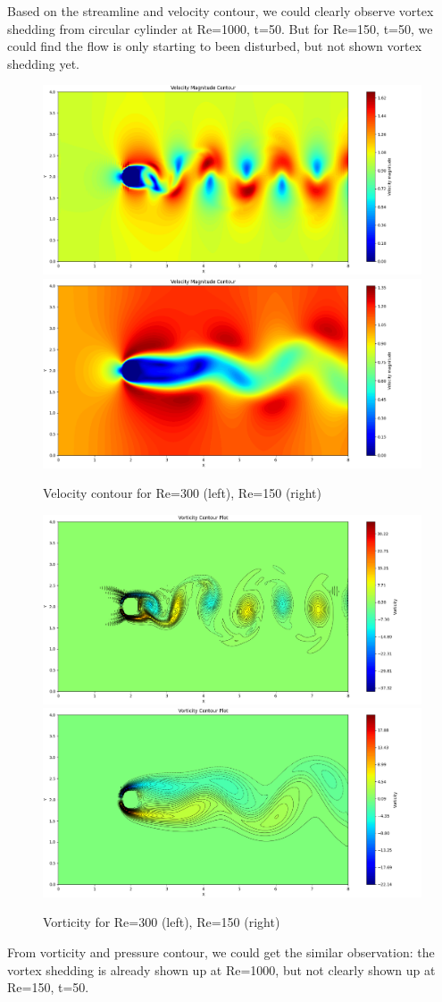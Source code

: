 \documentclass[12pt]{article}
\begin{document}
Based on the streamline and velocity contour, we could clearly observe vortex shedding from circular cylinder at Re=1000, t=50. But for Re=150, t=50, we could find the flow is only starting to been disturbed, but not shown vortex shedding yet.

\begin{figure}[H]
    \centering
    \includegraphics[width=0.45\linewidth]{figure/N32_Re1000_8x4_t50/v_N32_Re1000_8x4_t50.jpg}
    \includegraphics[width=0.45\linewidth]{figure/N32_Re150_8x4_t50/v_N32_Re150_8x4_t50.jpg}
    \caption{Velocity contour for Re=300 (left), Re=150 (right) }
\end{figure}




\begin{figure}[H]
    \centering
    \includegraphics[width=0.45\linewidth]{figure/N32_Re1000_8x4_t50/vor_N32_Re1000_8x4_t50.jpg}
    \includegraphics[width=0.45\linewidth]{figure/N32_Re150_8x4_t50/vor_N32_Re150_8x4_t50.jpg}
    \caption{Vorticity for Re=300 (left), Re=150 (right) }
\end{figure}

From vorticity and pressure contour, we could get the similar observation: the vortex shedding is already shown up at Re=1000, but not clearly shown up at Re=150, t=50.
\end{document}
